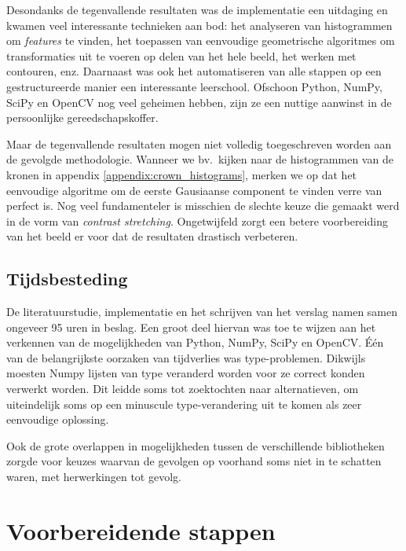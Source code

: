 \documentclass[10pt,a4paper]{article}
\begin{document}
Desondanks de tegenvallende resultaten was de implementatie een uitdaging en kwamen veel interessante technieken aan bod: het analyseren van histogrammen om \emph{features} te vinden, het toepassen van eenvoudige geometrische algoritmes om transformaties uit te voeren op delen van het hele beeld, het werken met contouren, enz. Daarnaast was ook het automatiseren van alle stappen op een gestructureerde manier een interessante leerschool. Ofschoon Python, NumPy, SciPy en OpenCV nog veel geheimen hebben, zijn ze een nuttige aanwinst in de persoonlijke gereedschapskoffer.

Maar de tegenvallende resultaten mogen niet volledig toegeschreven worden aan de gevolgde methodologie. Wanneer we bv.\ kijken naar de histogrammen van de kronen in appendix \ref{appendix:crown_histograms}, merken we op dat het eenvoudige algoritme om de eerste Gausiaanse component te vinden verre van perfect is. Nog veel fundamenteler is misschien de slechte keuze die gemaakt werd in de vorm van \emph{contrast stretching}. Ongetwijfeld zorgt een betere voorbereiding van het beeld er voor dat de resultaten drastisch verbeteren.

\subsection*{Tijdsbesteding}

De literatuurstudie, implementatie en het schrijven van het verslag namen samen ongeveer 95 uren in beslag. Een groot deel hiervan was toe te wijzen aan het verkennen van de mogelijkheden van Python, NumPy, SciPy en OpenCV. \'E\'en van de belangrijkste oorzaken van tijdverlies was type-problemen. Dikwijls moesten Numpy lijsten van type veranderd worden voor ze correct konden verwerkt worden. Dit leidde soms tot zoektochten naar alternatieven, om uiteindelijk soms op een minuscule type-verandering uit te komen als zeer eenvoudige oplossing.

Ook de grote overlappen in mogelijkheden tussen de verschillende bibliotheken zorgde voor keuzes waarvan de gevolgen op voorhand soms niet in te schatten waren, met herwerkingen tot gevolg.





\newpage

\appendix

\section{Voorbereidende stappen}
\end{document}
